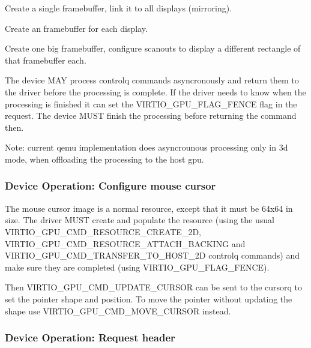 \begin{itemize*}
\item Create a single framebuffer, link it to all displays
  (mirroring).
\item Create an framebuffer for each display.
\item Create one big framebuffer, configure scanouts to display a
  different rectangle of that framebuffer each.
\end{itemize*}


The device MAY process controlq commands asyncronously and return them
to the driver before the processing is complete.  If the driver needs
to know when the processing is finished it can set the
VIRTIO_GPU_FLAG_FENCE flag in the request.  The device MUST finish the
processing before returning the command then.

Note: current qemu implementation does asyncrounous processing only in
3d mode, when offloading the processing to the host gpu.

\subsubsection{Device Operation: Configure mouse cursor}

The mouse cursor image is a normal resource, except that it must be
64x64 in size.  The driver MUST create and populate the resource
(using the usual VIRTIO_GPU_CMD_RESOURCE_CREATE_2D,
VIRTIO_GPU_CMD_RESOURCE_ATTACH_BACKING and
VIRTIO_GPU_CMD_TRANSFER_TO_HOST_2D controlq commands) and make sure they
are completed (using VIRTIO_GPU_FLAG_FENCE).

Then VIRTIO_GPU_CMD_UPDATE_CURSOR can be sent to the cursorq to set
the pointer shape and position.  To move the pointer without updating
the shape use VIRTIO_GPU_CMD_MOVE_CURSOR instead.

\subsubsection{Device Operation: Request header}\label{sec:Device Types / GPU Device / Device Operation / Device Operation: Request header}

